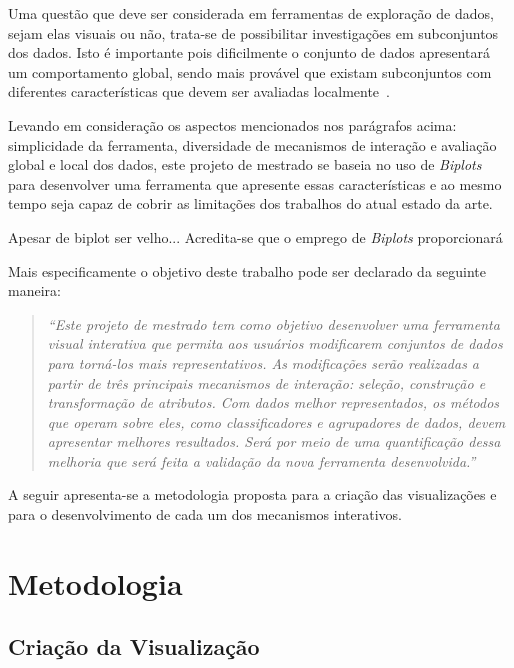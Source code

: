 Uma questão que deve ser considerada em ferramentas de
exploração de dados, sejam elas visuais ou não, trata-se de
possibilitar investigações em subconjuntos dos dados. Isto é
importante pois dificilmente o conjunto de dados apresentará
um comportamento global, sendo mais provável que existam
subconjuntos com diferentes características que devem ser
avaliadas localmente~\cite{May2011}.

Levando em consideração os aspectos mencionados nos
parágrafos acima: simplicidade da ferramenta, diversidade de
mecanismos de interação e avaliação global e local dos
dados, este projeto de mestrado se baseia no uso de
\emph{Biplots} para desenvolver uma ferramenta que apresente
essas características e ao mesmo tempo seja capaz de cobrir as limitações dos trabalhos do atual estado da arte.

Apesar de biplot ser velho...
Acredita-se que o emprego de \emph{Biplots} proporcionará 

Mais especificamente o objetivo deste trabalho pode ser
declarado da seguinte maneira:

\begin{quote}
    \emph{``Este projeto de mestrado tem como objetivo
        desenvolver uma ferramenta visual interativa que
        permita aos usuários modificarem conjuntos de dados
        para torná-los mais representativos. As modificações
        serão realizadas a partir de três principais
        mecanismos de interação: seleção, construção e
        transformação de atributos. Com dados melhor
        representados, os métodos que operam sobre eles,
        como classificadores e agrupadores de dados, devem
        apresentar melhores resultados. Será por meio de uma
        quantificação dessa melhoria que será feita a
    validação da nova ferramenta desenvolvida.''}
\end{quote}

A seguir apresenta-se a metodologia proposta para a criação
das visualizações e para o desenvolvimento de cada um dos
mecanismos interativos.

\section{Metodologia}


\subsection{Criação da Visualização}

